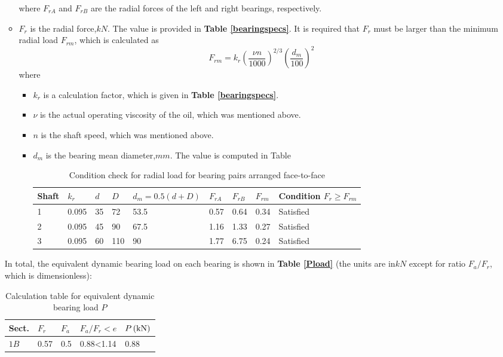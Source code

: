 \begin{itemize}
\begin{itemize}
		where $ F_{rA} $ and $ F_{rB} $ are the radial forces of the left and right bearings, respectively.
		\item $ F_r $ is the radial force,$ \unit{kN} $. The value is provided in \textbf{Table \ref{bearingspecs}}. It is required that $ F_r $ must be larger than the minimum radial load $ F_{rm} $, which is calculated as
		\[
		F_{rm} = k_r \left(\dfrac{\nu n}{1000}\right)^{2/3}(\dfrac{d_m}{100})^2
		\]
		where
		\begin{itemize}
			\item $ k_r $ is a calculation factor, which is given in \textbf{Table \ref{bearingspecs}}.
			\item $ \nu $ is the actual operating viscosity of the oil, which was mentioned above.
			\item $ n $ is the shaft speed, which was mentioned above.
			\item $ d_m $ is the bearing mean diameter,$ \unit{mm} $. The value is computed in Table
			\begin{table}[ht]
				\centering
				\caption{Condition check for radial load for bearing pairs arranged face-to-face}
				\begin{tabular}{lllllllll}\toprule
					Shaft & $ k_r $ & $ d $ & $ D $ & $ d_m = 0.5(d+D) $ & $ F_{rA} $ & $ F_{rB} $ & $ F_{rm} $ & Condition $ F_r \geq F_{rm} $ \\\midrule
					1 & 0.095 & 35 & 72 & 53.5 & 0.57 & 0.64 & 0.34 & Satisfied \\
					2 & 0.095 & 45 & 90 & 67.5 & 1.16 & 1.33 & 0.27 & Satisfied \\
					3 & 0.095 & 60 & 110 & 90 & 1.77 & 6.75 & 0.24 & Satisfied \\\bottomrule
				\end{tabular}
				\label{Frm}
			\end{table}
		\end{itemize}
	\end{itemize}
	In total, the equivalent dynamic bearing load on each bearing is shown in \textbf{Table \ref{Pload}} (the units are in$ \unit{kN} $ except for ratio $ F_a/F_r $, which is dimensionless):
	\begin{table}[ht]
		\centering
		\caption{Calculation table for equivalent dynamic bearing load $ P $}
		\begin{tabular}{lllll}\toprule
			Sect. & $ F_r $ & $ F_a $ & $ F_a/F_r < e $ & $ P \, (\mathrm{kN}) $ \\ \midrule
			$ 1B $ & 0.57 & 0.5  & 0.88<1.14 & 0.88 \\

\end{tabular}
\end{table}
\end{itemize}
